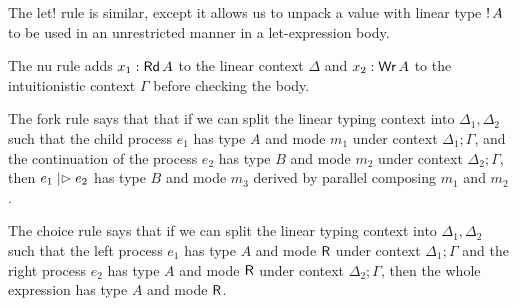 The let! rule is similar, except it allows us to unpack a value with linear type
${!}\,{A}$ to be used in an unrestricted manner in a let-expression body.

The nu rule adds $x_1: \text{\textsf{Rd}}\,A$ to the linear context $\Delta$ and $x_2 : \text{\textsf{Wr}}\,A$
to the intuitionistic context $\Gamma$ before checking the body.

The fork rule says that that if we can split the linear typing context into
$\Delta_1, \Delta_2$ such that the child process $e_1$ has type $A$ and mode $m_1$ under
context $\Delta_1; \Gamma$, and the continuation of the process $e_2$ has type $B$ and
mode $m_2$ under context $\Delta_2; \Gamma$, then $e_1 \mathrel{|\rhd} e_2$ has type $B$ and mode
$m_3$ derived by parallel composing $m_1$ and $m_2$. 

The choice rule says that if we can split the linear typing context into $\Delta_1,
\Delta_2$ such that the left process $e_1$ has type $A$ and mode $\textsf{R}$ under context
$\Delta_1; \Gamma$ and the right process $e_2$ has type $A$ and mode $\textsf{R}$ under context
$\Delta_2; \Gamma$, then the whole expression has type $A$ and mode $\textsf{R}$.

